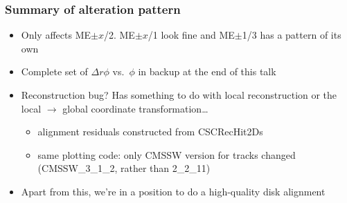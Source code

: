 \documentclass[compress]{beamer}
\begin{document}
\begin{frame}
\frametitle{Summary of alteration pattern}

\begin{itemize}\setlength{\itemsep}{0.25 cm}
\item Only affects ME$\pm x$/2.  ME$\pm x$/1 look fine and ME$\pm$1/3
  has a pattern of its own
\item Complete set of $\Delta r\phi$ vs.~$\phi$ in backup at the end of this talk
\item Reconstruction bug?  Has something to do with local
  reconstruction or the local $\to$ global coordinate transformation\ldots
\begin{itemize}
\item alignment residuals constructed from CSCRecHit2Ds
\item same plotting code: only CMSSW version for tracks changed
  (CMSSW\_3\_1\_2, rather than 2\_2\_11)
\end{itemize}

\item Apart from this, we're in a position to do a high-quality disk alignment
\end{itemize}
\end{frame}
\end{document}
